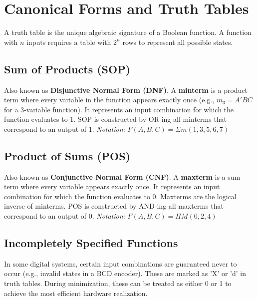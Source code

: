 \section{Canonical Forms and Truth Tables}

\begin{remark}
A truth table is the unique algebraic signature of a Boolean function. A function with $n$ inputs requires a table with $2^n$ rows to represent all possible states.
\end{remark}

\subsection{Sum of Products (SOP)}

\begin{definition}
Also known as \textbf{Disjunctive Normal Form (DNF)}. A \textbf{minterm} is a product term where every variable in the function appears exactly once (e.g., $m_3 = A'BC$ for a 3-variable function). It represents an input combination for which the function evaluates to 1. SOP is constructed by OR-ing all minterms that correspond to an output of 1.
\textit{Notation:} $F(A,B,C) = \Sigma m(1, 3, 5, 6, 7)$
\end{definition}

\subsection{Product of Sums (POS)}

\begin{definition}
Also known as \textbf{Conjunctive Normal Form (CNF)}. A \textbf{maxterm} is a sum term where every variable appears exactly once. It represents an input combination for which the function evaluates to 0. Maxterms are the logical inverse of minterms. POS is constructed by AND-ing all maxterms that correspond to an output of 0.
\textit{Notation:} $F(A,B,C) = \Pi M(0, 2, 4)$
\end{definition}

\subsection{Incompletely Specified Functions}

\begin{vocabulary}
In some digital systems, certain input combinations are guaranteed never to occur (e.g., invalid states in a BCD encoder). These are marked as 'X' or 'd' in truth tables. During minimization, these can be treated as either 0 or 1 to achieve the most efficient hardware realization.
\end{vocabulary}

